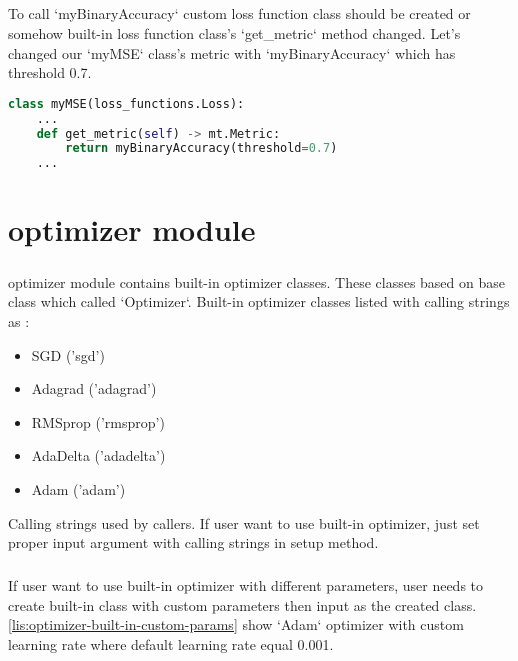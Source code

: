 \documentclass[12pt]{report}
\begin{document}
\paragraph{}
To call `myBinaryAccuracy` custom loss function class should be created or somehow built-in loss function class's `get\_metric` method changed. Let's changed our `myMSE` class's metric with `myBinaryAccuracy` which has threshold 0.7.

\begin{lstlisting}[language=Python, numbers=none, caption={Calling custom metric class.}, label={lis:metric-binary-custom-class}]
class myMSE(loss_functions.Loss):
	...
	def get_metric(self) -> mt.Metric:
		return myBinaryAccuracy(threshold=0.7)
	...

\end{lstlisting}






\chapter{optimizer module}
\label{ch:optimizer}

\paragraph{}
optimizer module contains built-in optimizer classes. These classes based on base class which called `Optimizer`. Built-in optimizer classes listed with calling strings as : 

\begin{itemize}
	\item SGD ('sgd')
	\item Adagrad ('adagrad')
	\item RMSprop ('rmsprop')
	\item AdaDelta ('adadelta')
	\item Adam ('adam')
\end{itemize}

Calling strings used by callers. If user want to use built-in optimizer, just set proper input argument with calling strings in setup method. 

\paragraph{}
If user want to use built-in optimizer with different parameters, user needs to create built-in class with custom parameters then input as the created class. \ref{lis:optimizer-built-in-custom-params} show `Adam` optimizer with custom learning rate where default learning rate equal 0.001.
\end{document}
